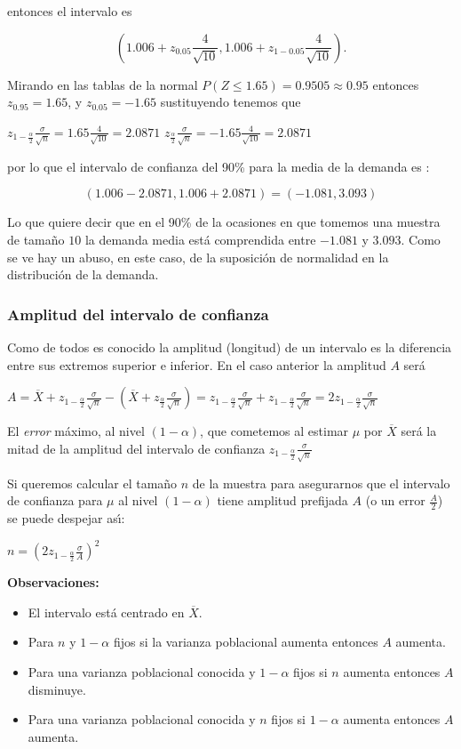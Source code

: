 \documentclass[12pt]{report}
\begin{document}
    entonces el intervalo es


    $$\left(1.006+z_{0.05}\frac{4}{\sqrt{10}},1.006+z_{1-0.05}\frac{4}{\sqrt{10}}\right).$$

    Mirando en las tablas de la normal $P(Z\leq 1.65)=0.9505\approx
    0.95$ entonces  $z_{0.95}=1.65$, y $z_{0.05}=-1.65$
    sustituyendo tenemos que

    $z_{1-\frac{\alpha}{2}}\frac{\sigma}{\sqrt{n}}=1.65 \frac{4}{\sqrt{10}}=2.0871$
    $z_{\frac{\alpha}{2}}\frac{\sigma}{\sqrt{n}}=-1.65 \frac{4}{\sqrt{10}}=2.0871$

por lo que  el intervalo de confianza del 90\% para la media de la demanda es :

$$\left(1.006-2.0871,1.006+2.0871\right)=\left(-1.081,3.093\right)$$


Lo que quiere decir que en el 90\% de la ocasiones en que tomemos una muestra de tama\~{n}o
$10$ la demanda media est\'a comprendida entre $-1.081$ y $3.093$. Como se ve hay un abuso,
en este caso, de la suposici\'on de normalidad en la distribuci\'on de la demanda.


    \subsubsection{Amplitud del intervalo de confianza}
    Como de todos es conocido la amplitud (longitud) de un intervalo
    es la diferencia entre sus extremos superior e inferior. En el
    caso anterior la amplitud $A$ ser\'a

    $A=\overline{X}+z_{1-\frac{\alpha}{2}}\frac{\sigma}{\sqrt{n}}-
 \left(\overline{X}+z_{\frac{\alpha}{2}}
 \frac{\sigma}{\sqrt{n}}\right)=
z_{1-\frac{\alpha}{2}}\frac{\sigma}{\sqrt{n}}+z_{1-\frac{\alpha}{2}}\frac{\sigma}{\sqrt{n}}=2
z_{1-\frac{\alpha}{2}}\frac{\sigma}{\sqrt{n}}$

El \emph{error} m\'aximo, al nivel $(1-\alpha)$, que cometemos al estimar $\mu$ por
$\overline{X}$ ser\'a la mitad de la amplitud del  intervalo de confianza $
z_{1-\frac{\alpha}{2}}\frac{\sigma}{\sqrt{n}}$

Si queremos calcular el tama\~{n}o $n$ de la muestra para asegurarnos que el intervalo de
confianza para $\mu$ al nivel $(1-\alpha)$ tiene amplitud prefijada $A$ (o un error
$\frac{A}{2}$)  se puede despejar as\'{\i}:

$n=\left(  2 z_{1-\frac{\alpha}{2}}\frac{\sigma}{A} \right)^2$


    \textbf{Observaciones:}

    \begin{itemize}
    \item El intervalo est\'a centrado en $\overline{X}$.
    \item  Para $n$ y $1-\alpha$ fijos si la varianza poblacional aumenta entonces $A$
    aumenta.
    \item Para una varianza poblacional conocida y $1-\alpha$ fijos  si $n$ aumenta entonces
      $A$ disminuye.
      \item Para una varianza poblacional conocida y $n$ fijos  si
      $1-\alpha$ aumenta entonces $A$ aumenta.
    \end{itemize}
\end{document}

